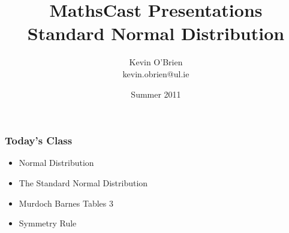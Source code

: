 \documentclass[a4]{beamer}
\title[MathsCast]{MathsCast Presentations \\ {\normalsize Standard Normal Distribution}}
\author[Kevin O'Brien]{Kevin O'Brien \\ {\scriptsize kevin.obrien@ul.ie}}
\date{Summer 2011}
\institute[Maths \& Stats]{Dept. of Mathematics \& Statistics, \\ University \textit{of} Limerick}
\begin{document}
\begin{frame}
\frametitle{ Today's Class }
\large
\begin{itemize}
\item Normal Distribution
\item The Standard Normal Distribution
\item Murdoch Barnes Tables 3
\item Symmetry Rule
\end{itemize}
\end{frame}


\end{document}
